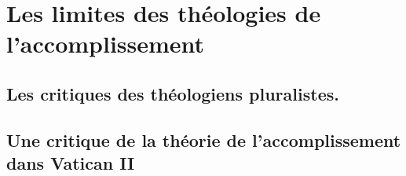  
  \section{Les limites des théologies de
  l'accomplissement}



   
    
    \subsection{Les critiques des théologiens pluralistes.}
    
   
    
    \subsection{Une critique de la théorie de l'accomplissement dans Vatican
    II}
    

 




